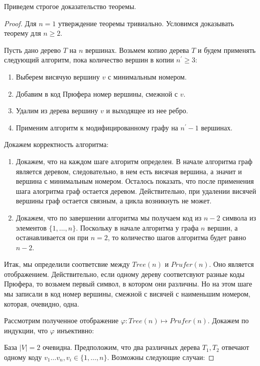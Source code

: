 Приведем строгое доказательство теоремы.
\begin{proof}
	Для $n = 1$ утверждение теоремы тривиально.
	Условимся доказывать теорему для $n \geqslant 2$.
	\medskip
	
	Пусть дано дерево $T$ на $n$ вершинах. Возьмем копию дерева $T$ и будем применять следующий алгоритм, пока количество вершин в копии $n^{\prime} \geqslant 3$:
	\begin{enumerate}
		\item Выберем висячую вершину $v$ с минимальным номером. 
		\item Добавим в код Прюфера номер вершины, смежной с $v$.
		\item Удалим из дерева вершину $v$ и выходящее из нее ребро.
		\item Применим алгоритм к модифицированному графу на $n^{\prime} - 1$ вершинах.
	\end{enumerate}
	
	Докажем корректность алгоритма:
	\begin{enumerate} \renewcommand{\theenumi}{\bfseries \Roman{enumi}}
		\item Докажем, что на каждом шаге алгоритм определен. В начале алгоритма граф является деревом, следовательно, в нем есть висячая вершина, а значит и вершина с минимальным номером. Осталось показать, что после применения шага алогритма граф остается деревом. Действительно, при удалении висячей вершины граф остается связным, а цикла возникнуть не может.
		
		\item Докажем, что по завершении алгоритма мы получаем код из $n-2$ символа из элементов $\{1, \ldots, n\}$. Поскольку в начале алгоритма у графа $n$ вершин, а останавливается он при $n = 2$, то количество шагов алгоритма будет равно $n - 2$.
	\end{enumerate}
	
	
	Итак, мы определили соответсвие между $Tree(n)$ и $Prufer(n)$. Оно является отображением. Действительно, если одному дереву соответсвуют разные коды Прюфера, то возьмем первый символ, в котором они различны. Но на этом шаге мы записали в код номер вершины, смежной с висячей с наименьшим номером, которая, очевидно, одна.
	\medskip
	
	Рассмотрим полученное отображение $\varphi : Tree(n) \mapsto Prufer(n)$. Докажем по индукции, что $\varphi$ инъективно:
	
	База $|V| = 2$ очевидна. Предположим, что два различных дерева $T_{1}, T_{2}$ отвечают одному коду $v_{1} \ldots v_{n}, v_{i} \in\{1, \ldots, n\}$.
	Возможны следующие случаи:
	

\end{proof}
